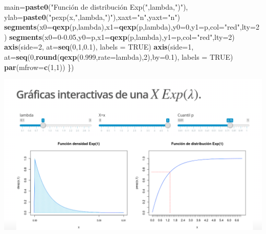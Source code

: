 \documentclass[]{book}
\newenvironment{Shaded}{\begin{snugshade}}{\end{snugshade}}
\newcommand{\DataTypeTok}[1]{\textcolor[rgb]{0.13,0.29,0.53}{#1}}
\newcommand{\DecValTok}[1]{\textcolor[rgb]{0.00,0.00,0.81}{#1}}
\newcommand{\FloatTok}[1]{\textcolor[rgb]{0.00,0.00,0.81}{#1}}
\newcommand{\KeywordTok}[1]{\textcolor[rgb]{0.13,0.29,0.53}{\textbf{#1}}}
\newcommand{\NormalTok}[1]{#1}
\newcommand{\OtherTok}[1]{\textcolor[rgb]{0.56,0.35,0.01}{#1}}
\newcommand{\StringTok}[1]{\textcolor[rgb]{0.31,0.60,0.02}{#1}}
\begin{document}
\begin{Shaded}
\begin{Highlighting}[]
        \DataTypeTok{main=}\KeywordTok{paste0}\NormalTok{(}\StringTok{"Función de distribución Exp("}\NormalTok{,lambda,}\StringTok{")"}\NormalTok{),}
        \DataTypeTok{ylab=}\KeywordTok{paste0}\NormalTok{(}\StringTok{"pexp(x,"}\NormalTok{,lambda,}\StringTok{")"}\NormalTok{),}\DataTypeTok{xaxt=}\StringTok{"n"}\NormalTok{,}\DataTypeTok{yaxt=}\StringTok{"n"}\NormalTok{)}
  \KeywordTok{segments}\NormalTok{(}\DataTypeTok{x0=}\KeywordTok{qexp}\NormalTok{(p,lambda),}\DataTypeTok{x1=}\KeywordTok{qexp}\NormalTok{(p,lambda),}\DataTypeTok{y0=}\DecValTok{0}\NormalTok{,}\DataTypeTok{y1=}\NormalTok{p,}\DataTypeTok{col=}\StringTok{"red"}\NormalTok{,}\DataTypeTok{lty=}\DecValTok{2}\NormalTok{)}
  \KeywordTok{segments}\NormalTok{(}\DataTypeTok{x0=}\DecValTok{0}\FloatTok{-0.05}\NormalTok{,}\DataTypeTok{y0=}\NormalTok{p,}\DataTypeTok{x1=}\KeywordTok{qexp}\NormalTok{(p,lambda),}\DataTypeTok{y1=}\NormalTok{p,}\DataTypeTok{col=}\StringTok{"red"}\NormalTok{,}\DataTypeTok{lty=}\DecValTok{2}\NormalTok{)}
  \KeywordTok{axis}\NormalTok{(}\DataTypeTok{side=}\DecValTok{2}\NormalTok{, }\DataTypeTok{at=}\KeywordTok{seq}\NormalTok{(}\DecValTok{0}\NormalTok{,}\DecValTok{1}\NormalTok{,}\FloatTok{0.1}\NormalTok{), }\DataTypeTok{labels =} \OtherTok{TRUE}\NormalTok{)}
  \KeywordTok{axis}\NormalTok{(}\DataTypeTok{side=}\DecValTok{1}\NormalTok{, }\DataTypeTok{at=}\KeywordTok{seq}\NormalTok{(}\DecValTok{0}\NormalTok{,}\KeywordTok{round}\NormalTok{(}\KeywordTok{qexp}\NormalTok{(}\FloatTok{0.999}\NormalTok{,}\DataTypeTok{rate=}\NormalTok{lambda),}\DecValTok{2}\NormalTok{),}\DataTypeTok{by=}\FloatTok{0.1}\NormalTok{), }\DataTypeTok{labels =} \OtherTok{TRUE}\NormalTok{)}
  \KeywordTok{par}\NormalTok{(}\DataTypeTok{mfrow=}\KeywordTok{c}\NormalTok{(}\DecValTok{1}\NormalTok{,}\DecValTok{1}\NormalTok{))}
\NormalTok{\})}
\end{Highlighting}
\end{Shaded}

\href{https://joanby.shinyapps.io/DistribucionesNotables/}{\includegraphics{Images/noshinyImages/interactiva_exponencial1.png}}
\end{document}
